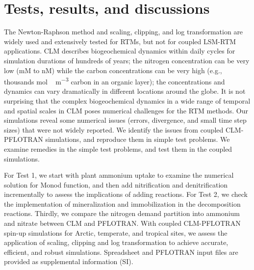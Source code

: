 \documentclass[gmd, manuscript]{copernicus}
\begin{document}
\section{Tests, results, and discussions}
The Newton-Raphson method and scaling, clipping, and log transformation are
widely used and extensively tested for RTMs, but not for coupled LSM-RTM applications. CLM
describes biogeochemical dynamics within daily cycles for simulation durations
of hundreds of years; the nitrogen concentration can be very low (\unit{mM} to
\unit{nM}) while the carbon concentrations can be very high (e.g., thousands
\unit{mol\,m^{-3}} carbon in an organic layer); the concentrations and dynamics
can vary dramatically in different locations around the globe. It is not
surprising that the complex biogeochemical dynamics in a wide range of temporal
and spatial scales in CLM poses numerical challenges for the RTM methods. Our
simulations reveal some numerical issues (errors, divergence, and small time
step sizes) that were not widely reported. We identify the issues from coupled
CLM-PFLOTRAN simulations, and reproduce them in simple test problems. We
examine remedies in the simple test problems, and test them in the coupled
simulations. 

For Test 1, we start with plant ammonium uptake to examine the numerical solution
for Monod function, and then add nitrification and denitrification
incrementally to assess the implications of adding reactions. For Test 2, we
check the implementation of mineralization and immobilization in the
decomposition reactions. Thirdly, we compare the nitrogen demand partition into
ammonium and nitrate between CLM and PFLOTRAN. With coupled CLM-PFLOTRAN
spin-up simulations for Arctic, temperate, and tropical sites, we assess the
application of scaling, clipping and log transformation to achieve accurate,
efficient, and robust simulations. Spreadsheet and PFLOTRAN input files are
provided as supplemental information (SI).
\end{document}
